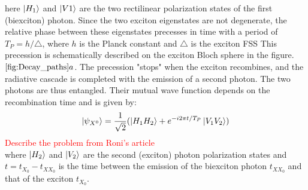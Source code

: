 	here $\ket{H_1}$ and $\ket{V1}$ are the two rectilinear polarization states of the first (biexciton) photon. Since the two exciton eigenstates are not degenerate, the relative phase between these eigenstates precesses in time with a period of $T_P = h/\triangle$, where $h$ is the Planck constant and $\triangle$ is the exciton FSS \cite{Winik2017}
	This precession is schematically described on the exciton Bloch sphere in the figure. $\ref{fig:Decay_paths}a$.
	The precession "stops" when the exciton recombines, and the radiative cascade is completed with the emission of a second photon. The two photons are thus entangled. Their mutual wave function depends on the recombination time and is given by:
	\begin{equation}
		\ket{\psi_{X^0}} = \frac{1}{\sqrt{2}}(\ket{H_1H_2} +e^{-i2\pi t/T_P}\ket{V_1V_2})
	\end{equation}
    \textcolor{red}{Describe the problem from Roni's article}\\
	where $\ket{H_2}$ and $\ket{V_2}$ are the second (exciton) photon polarization states and $t = t_{X_0} - t_{{XX}_0}$ is the time between the emission of the biexciton photon $t_{{XX}_0}$ and that of the exciton $t_{X_0}$.
